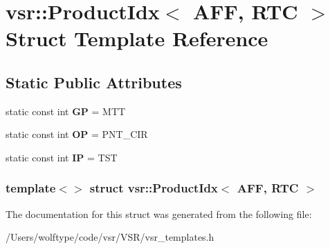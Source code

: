 \hypertarget{structvsr_1_1_product_idx_3_01_a_f_f_00_01_r_t_c_01_4}{\section{vsr\-:\-:Product\-Idx$<$ A\-F\-F, R\-T\-C $>$ Struct Template Reference}
\label{structvsr_1_1_product_idx_3_01_a_f_f_00_01_r_t_c_01_4}
}
\subsection*{Static Public Attributes}
\begin{DoxyCompactItemize}
\item 
\hypertarget{structvsr_1_1_product_idx_3_01_a_f_f_00_01_r_t_c_01_4_a16e2976e6e81fe690ef8fa330499017a}{static const int {\bfseries G\-P} = M\-T\-T}\label{structvsr_1_1_product_idx_3_01_a_f_f_00_01_r_t_c_01_4_a16e2976e6e81fe690ef8fa330499017a}

\item 
\hypertarget{structvsr_1_1_product_idx_3_01_a_f_f_00_01_r_t_c_01_4_a2a889b0463d63bda112f3c4b14bb418f}{static const int {\bfseries O\-P} = P\-N\-T\-\_\-\-C\-I\-R}\label{structvsr_1_1_product_idx_3_01_a_f_f_00_01_r_t_c_01_4_a2a889b0463d63bda112f3c4b14bb418f}

\item 
\hypertarget{structvsr_1_1_product_idx_3_01_a_f_f_00_01_r_t_c_01_4_a50769d9c5d3be26c6d7400f330b6f953}{static const int {\bfseries I\-P} = T\-S\-T}\label{structvsr_1_1_product_idx_3_01_a_f_f_00_01_r_t_c_01_4_a50769d9c5d3be26c6d7400f330b6f953}

\end{DoxyCompactItemize}
\subsubsection*{template$<$$>$ struct vsr\-::\-Product\-Idx$<$ A\-F\-F, R\-T\-C $>$}



The documentation for this struct was generated from the following file\-:\begin{DoxyCompactItemize}
\item 
/\-Users/wolftype/code/vsr/\-V\-S\-R/vsr\-\_\-templates.\-h\end{DoxyCompactItemize}
